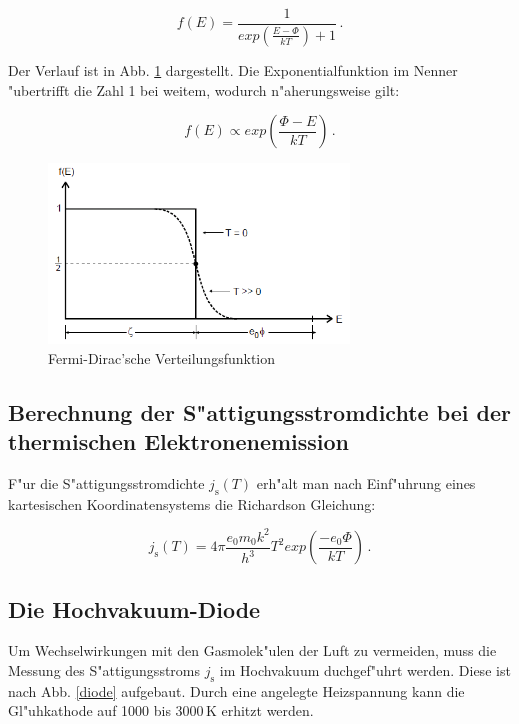 \begin{equation}
	f(E) = \frac{1}{exp( \frac{E - \Phi}{kT} ) + 1} \, .
\end{equation}

Der Verlauf ist in Abb. \ref{fermi} dargestellt.
Die Exponentialfunktion im Nenner "ubertrifft die Zahl 1 bei weitem, wodurch n"aherungsweise gilt:

\begin{equation}
	f(E) \propto exp ( \frac{\Phi - E}{kT}) \, .
\end{equation}

\begin{figure}[!h]
	\centering
	\includegraphics[width = 8cm]{img/Fermi.PNG}
	\caption{Fermi-Dirac'sche Verteilungsfunktion}
	\label{fermi}
\end{figure}

\subsection{Berechnung der S"attigungsstromdichte bei der thermischen Elektronenemission} %
\label{sub:berechnung_der_s_attigungsstromdichte_bei_der_thermischen_elektronenemission}

F"ur die S"attigungsstromdichte $j_\mathrm{s}(T)$ erh"alt man nach Einf"uhrung eines kartesischen Koordinatensystems die Richardson Gleichung:

\begin{equation}
	j_\mathrm{s}(T) = 4\pi \frac{e_\mathrm{0} m_\mathrm{0} k^2}{h^3} T^2 exp( \frac{-e_\mathrm{0} \Phi}{kT}) \, .
\end{equation}

\subsection{Die Hochvakuum-Diode} %
\label{sub:die_hochvakuum_diode}

Um Wechselwirkungen mit den Gasmolek"ulen der Luft zu vermeiden, muss die Messung des S"attigungsstroms $j_\mathrm{s}$ im Hochvakuum duchgef"uhrt werden.
Diese ist nach Abb. \ref{diode} aufgebaut.
Durch eine angelegte Heizspannung kann die Gl"uhkathode auf 1000 bis 3000\,K erhitzt werden.

